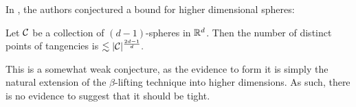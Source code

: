  In \cite{ellenberg2016new}, the authors conjectured a bound for higher dimensional spheres:
 \begin{conjecture}
     Let $\mathcal C$ be a collection of $(d-1)$-spheres in $\mathbb R^d$. Then the number of distinct points of tangencies is $\lesssim |\mathcal C|^{\frac{2d-1}{d}}.$
 \end{conjecture}

This is a somewhat weak conjecture, as the evidence to form it is simply the natural extension of the $\beta$-lifting technique into higher dimensions. 
As such, there is no evidence to suggest that it should be tight. 
